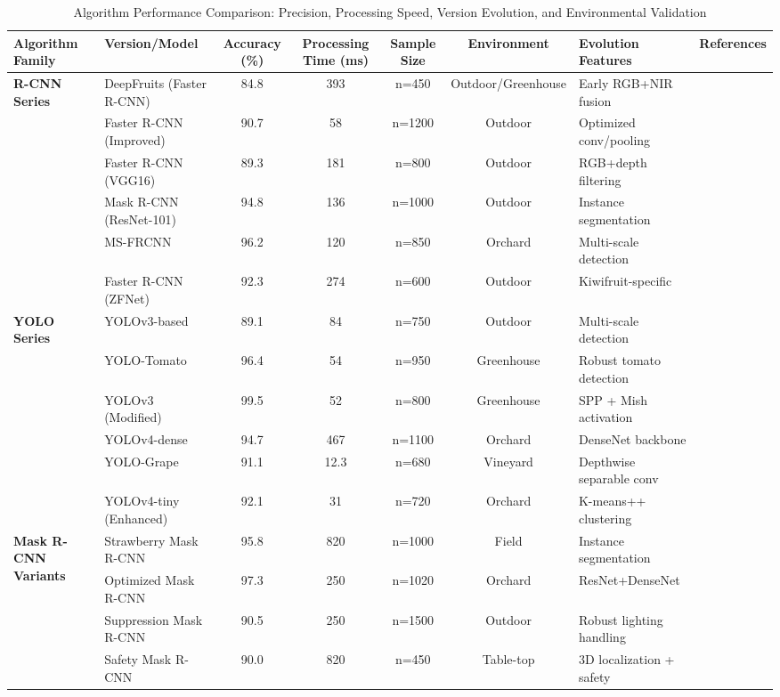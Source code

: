 \documentclass{ieeeaccess}
\begin{document}
\begin{table}[ht]
\centering
\small
\caption{Algorithm Performance Comparison: Precision, Processing Speed, Version Evolution, and Environmental Validation}
\label{tab:algorithm_comparison} 
\renewcommand{\arraystretch}{1.2}
\begin{tabularx}{\textwidth}{l X c c c c X X}
\toprule
\textbf{Algorithm Family} & \textbf{Version/Model} & \textbf{Accuracy (\%)} & \textbf{Processing Time (ms)} & \textbf{Sample Size} & \textbf{Environment} & \textbf{Evolution Features} & \textbf{References} \\ \midrule

\multirow{6}{*}{\textbf{R-CNN Series}} 
& DeepFruits (Faster R-CNN) & 84.8 & 393 & n=450 & Outdoor/Greenhouse & Early RGB+NIR fusion & \cite{sa2016deepfruits} \\
& Faster R-CNN (Improved) & 90.7 & 58 & n=1200 & Outdoor & Optimized conv/pooling & \cite{wan2020faster} \\
& Faster R-CNN (VGG16) & 89.3 & 181 & n=800 & Outdoor & RGB+depth filtering & \cite{fu2020faster} \\
& Mask R-CNN (ResNet-101) & 94.8 & 136 & n=1000 & Outdoor & Instance segmentation & \cite{gene2019multi} \\
& MS-FRCNN & 96.2 & 120 & n=850 & Orchard & Multi-scale detection & \cite{tu2020passion} \\
& Faster R-CNN (ZFNet) & 92.3 & 274 & n=600 & Outdoor & Kiwifruit-specific & \cite{fu2018kiwifruit} \\ \midrule

\multirow{6}{*}{\textbf{YOLO Series}} 
& YOLOv3-based & 89.1 & 84 & n=750 & Outdoor & Multi-scale detection & \cite{kuznetsova2020using} \\
& YOLO-Tomato & 96.4 & 54 & n=950 & Greenhouse & Robust tomato detection & \cite{liu2020yolo} \\
& YOLOv3 (Modified) & 99.5 & 52 & n=800 & Greenhouse & SPP + Mish activation & \cite{lawal2021tomato} \\
& YOLOv4-dense & 94.7 & 467 & n=1100 & Orchard & DenseNet backbone & \cite{gai2023detection} \\
& YOLO-Grape & 91.1 & 12.3 & n=680 & Vineyard & Depthwise separable conv & \cite{li2021real} \\
& YOLOv4-tiny (Enhanced) & 92.1 & 31 & n=720 & Orchard & K-means++ clustering & \cite{tang2023fruit} \\ \midrule

\multirow{4}{*}{\textbf{Mask R-CNN Variants}} 
& Strawberry Mask R-CNN & 95.8 & 820 & n=1000 & Field & Instance segmentation & \cite{yu2019fruit} \\
& Optimized Mask R-CNN & 97.3 & 250 & n=1020 & Orchard & ResNet+DenseNet & \cite{jia2020detection} \\
& Suppression Mask R-CNN & 90.5 & 250 & n=1500 & Outdoor & Robust lighting handling & \cite{chu2021deep} \\
& Safety Mask R-CNN & 90.0 & 820 & n=450 & Table-top & 3D localization + safety & \cite{ge2019fruit} \\ \midrule


\end{tabularx}
\end{table}
\end{document}

